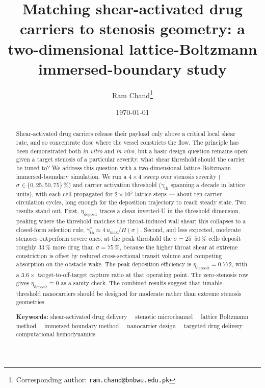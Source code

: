 \documentclass[11pt,a4paper]{article}
\title{\textbf{Matching shear-activated drug carriers to stenosis
       geometry: a two-dimensional lattice-Boltzmann
       immersed-boundary study}}
\author[1]{Ram Chand\thanks{Corresponding author:
   \texttt{ram.chand@bnbwu.edu.pk}}}
\affil[1]{Department of Natural Sciences,
   The Begum Nusrat Bhutto Women University,
   Sukkur, Sindh, Pakistan}
\date{\today}
\begin{document}

\maketitle

\begin{abstract}
\noindent Shear-activated drug carriers release their payload only
above a critical local shear rate, and so concentrate dose where
the vessel constricts the flow. The principle has been demonstrated
both \emph{in vitro} and \emph{in vivo}, but a basic design
question remains open: given a target stenosis of a particular
severity, what shear threshold should the carrier be tuned to?
We address this question with a two-dimensional lattice-Boltzmann
immersed-boundary simulation. We run a $4 \times 4$ sweep over
stenosis severity ($\sigma \in \{0,25,50,75\}\,\%$) and carrier
activation threshold ($\dot\gamma_{\text{th}}$ spanning a decade
in lattice units), with each cell propagated for $2 \times 10^{5}$
lattice steps --- about ten carrier-circulation cycles, long enough
for the deposition trajectory to reach steady state. Two results
stand out. First, $\eta_{\text{deposit}}$ traces a clean
inverted-U in the threshold dimension, peaking where the threshold
matches the throat-induced wall shear; this collapses to a
closed-form selection rule,
$\dot\gamma_{\text{th}}^{\star} \approx 4\,u_{\max}/H(\sigma)$.
Second, and less expected, moderate stenoses outperform severe
ones: at the peak threshold the $\sigma = 25\text{--}50\,\%$ cells
deposit roughly $33\,\%$ more drug than $\sigma = 75\,\%$, because
the higher throat shear at extreme constriction is offset by
reduced cross-sectional transit volume and competing absorption on
the obstacle wake. The peak deposition efficiency is
$\eta_{\text{deposit}} = 0.772$, with a $3.6\times$
target-to-off-target capture ratio at that operating point. The
zero-stenosis row gives $\eta_{\text{deposit}} \equiv 0$ as a
sanity check. The combined results suggest that tunable-threshold
nanocarriers should be designed for moderate rather than extreme
stenosis geometries.

\vspace{1em}
\noindent\textbf{Keywords:}
shear-activated drug delivery~\textperiodcentered~
stenotic microchannel~\textperiodcentered~
lattice Boltzmann method~\textperiodcentered~
immersed boundary method~\textperiodcentered~
nanocarrier design~\textperiodcentered~
targeted drug delivery~\textperiodcentered~
computational hemodynamics
\end{abstract}
\end{document}
